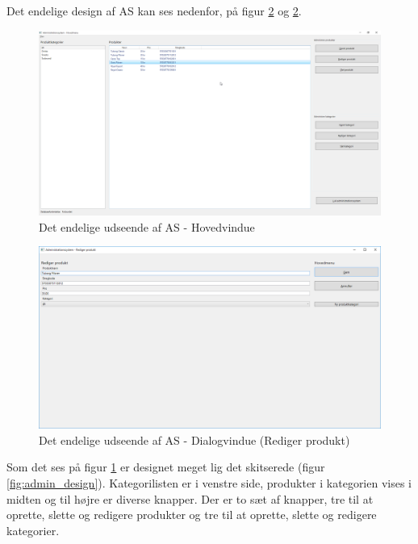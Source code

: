 Det endelige design af \gls{AS} kan ses nedenfor, på figur \ref{fig:admin_final_dialog} og \ref{fig:admin_final_dialog}.

\begin{figure}[H]
	\centering
	\includegraphics[width=1\textwidth]{Systemdesign/backend/Images/AdminDesignHovedvindue}
	\caption{Det endelige udseende af \gls{AS} - Hovedvindue}
	\label{fig:admin_final_hovedvindue}
\end{figure}

\begin{figure}[H]
	\centering
	\includegraphics[width=1\textwidth]{Systemdesign/backend/Images/AdminDesignRedigerProdukt}
	\caption{Det endelige udseende af \gls{AS} - Dialogvindue (Rediger produkt)}
	\label{fig:admin_final_dialog}
\end{figure}

Som det ses på figur \ref{fig:admin_final_hovedvindue} er designet meget lig det skitserede (figur \ref{fig:admin_design}). Kategorilisten er i venstre side, produkter i kategorien vises i midten og til højre er diverse knapper. Der er to sæt af knapper, tre til at oprette, slette og redigere produkter og tre til at oprette, slette og redigere kategorier.\\

